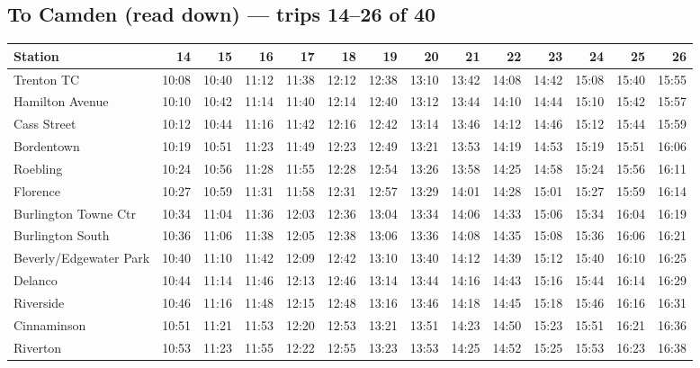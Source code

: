 \subsection*{To Camden (read down) --- trips 14--26 of 40}
\begin{center}\footnotesize\setlength{\tabcolsep}{3pt}\begin{tabular}{@{}lrrrrrrrrrrrrr@{}}\toprule
Station & 14 & 15 & 16 & 17 & 18 & 19 & 20 & 21 & 22 & 23 & 24 & 25 & 26 \\\midrule
Trenton TC & 10:08 & 10:40 & 11:12 & 11:38 & 12:12 & 12:38 & 13:10 & 13:42 & 14:08 & 14:42 & 15:08 & 15:40 & 15:55 \\
Hamilton Avenue & 10:10 & 10:42 & 11:14 & 11:40 & 12:14 & 12:40 & 13:12 & 13:44 & 14:10 & 14:44 & 15:10 & 15:42 & 15:57 \\
Cass Street & 10:12 & 10:44 & 11:16 & 11:42 & 12:16 & 12:42 & 13:14 & 13:46 & 14:12 & 14:46 & 15:12 & 15:44 & 15:59 \\
Bordentown & 10:19 & 10:51 & 11:23 & 11:49 & 12:23 & 12:49 & 13:21 & 13:53 & 14:19 & 14:53 & 15:19 & 15:51 & 16:06 \\
Roebling & 10:24 & 10:56 & 11:28 & 11:55 & 12:28 & 12:54 & 13:26 & 13:58 & 14:25 & 14:58 & 15:24 & 15:56 & 16:11 \\
Florence & 10:27 & 10:59 & 11:31 & 11:58 & 12:31 & 12:57 & 13:29 & 14:01 & 14:28 & 15:01 & 15:27 & 15:59 & 16:14 \\
Burlington Towne Ctr & 10:34 & 11:04 & 11:36 & 12:03 & 12:36 & 13:04 & 13:34 & 14:06 & 14:33 & 15:06 & 15:34 & 16:04 & 16:19 \\
Burlington South & 10:36 & 11:06 & 11:38 & 12:05 & 12:38 & 13:06 & 13:36 & 14:08 & 14:35 & 15:08 & 15:36 & 16:06 & 16:21 \\
Beverly/Edgewater Park & 10:40 & 11:10 & 11:42 & 12:09 & 12:42 & 13:10 & 13:40 & 14:12 & 14:39 & 15:12 & 15:40 & 16:10 & 16:25 \\
Delanco & 10:44 & 11:14 & 11:46 & 12:13 & 12:46 & 13:14 & 13:44 & 14:16 & 14:43 & 15:16 & 15:44 & 16:14 & 16:29 \\
Riverside & 10:46 & 11:16 & 11:48 & 12:15 & 12:48 & 13:16 & 13:46 & 14:18 & 14:45 & 15:18 & 15:46 & 16:16 & 16:31 \\
Cinnaminson & 10:51 & 11:21 & 11:53 & 12:20 & 12:53 & 13:21 & 13:51 & 14:23 & 14:50 & 15:23 & 15:51 & 16:21 & 16:36 \\
Riverton & 10:53 & 11:23 & 11:55 & 12:22 & 12:55 & 13:23 & 13:53 & 14:25 & 14:52 & 15:25 & 15:53 & 16:23 & 16:38 \\

\end{tabular}
\end{center}
